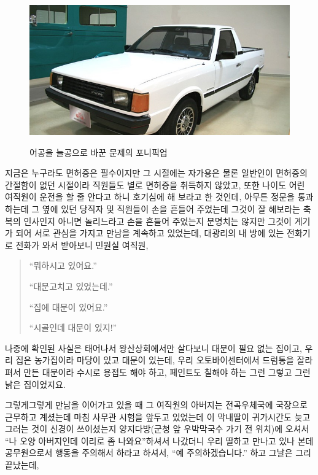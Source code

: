 \documentclass[chapter,book,openany,twoside]{oblivoir}
\begin{document}
\begin{figure}[t]
\centering\includegraphics[scale=0.4]{DBs/pic/005.jpg}\\
\caption{어공을 늘공으로 바꾼 문제의 포니픽업}
\end{figure}



지금은 누구라도 면허증은 필수이지만 그 시절에는 자가용은 물론 일반인이 면허증의 간절함이 없던 시절이라 직원들도 별로 면허증을 취득하지 않았고, 또한 나이도 어린 여직원이 운전을 할 줄 안다고 하니 호기심에 해 보라고 한 것인데, 아무튼 정문을 통과하는데 그 옆에 있던 당직자 및 직원들이 손을 흔들어 주었는데 그것이 잘 해보라는 축복의 인사인지 아니면 놀리느라고 손을 흔들어 주었는지 분명치는 않지만 그것이 계기가 되어 서로 관심을 가지고 만남을 계속하고 있었는데, 대광리의 내 방에 있는 전화기로 전화가 와서 받아보니 민원실 여직원,

\begin{quote}
``뭐하시고 있어요.''

``대문고치고 있었는데.''

``집에 대문이 있어요.''

``시골인데 대문이 있지!''
\end{quote}
나중에 확인된 사실은 태어나서 왕산상회에서만 살다보니 대문이 필요 없는 집이고, 우리 집은 농가집이라 마당이 있고 대문이 있는데, 우리 오토바이센터에서 드럼통을 잘라 펴서 만든 대문이라 수시로 용접도 해야 하고, 페인트도 칠해야 하는 그런 그렇고 그런 낡은 집이었지요.

그렇게그렇게 만남을 이어가고 있을 때 그 여직원의 아버지는 전곡우체국에 국장으로 근무하고 계셨는데 마침 사무관 시험을 앞두고 있었는데 이 막내딸이 귀가시간도 늦고 그러는 것이 신경이 쓰이셨는지 양지다방(군청 앞 우박막국수 가기 전 위치)에 오셔서 ``나 오양 아버지인데 이리로 좀 나와요''하셔서 나갔더니 우리 딸하고 만나고 있나 본데 공무원으로서 행동을 주의해서 하라고 하셔서, ``예 주의하겠습니다.'' 하고 그날은 그리 끝났는데,
\end{document}
